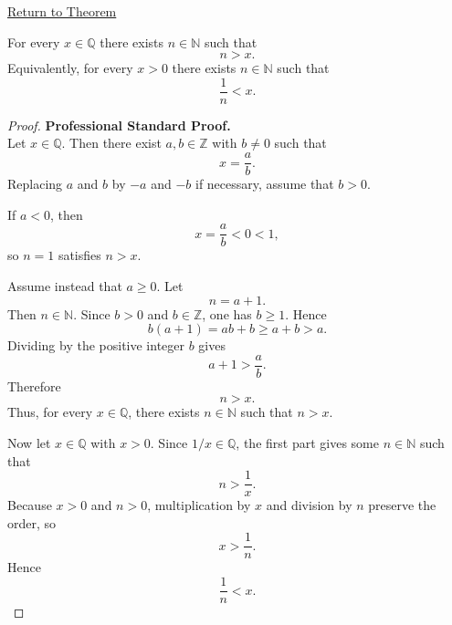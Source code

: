 \newpage
{}
\label{prf:archimedean-q}

\begin{remark*}[Return]
\hyperref[thm:archimedean-q]{Return to Theorem}
\end{remark*}

\begin{theorem*}
For every $x\in\mathbb{Q}$ there exists $n\in\mathbb{N}$ such that
\[
n>x.
\]
Equivalently, for every $x>0$ there exists $n\in\mathbb{N}$ such that
\[
\frac{1}{n}<x.
\]
\end{theorem*}

\begin{proof}
\textbf{Professional Standard Proof.}~\\
Let $x \in \mathbb{Q}$. Then there exist $a,b \in \mathbb{Z}$ with
$b \neq 0$ such that
\[
x=\frac{a}{b}.
\]
Replacing $a$ and $b$ by $-a$ and $-b$ if necessary, assume that
$b>0$.

If $a<0$, then
\[
x=\frac{a}{b}<0<1,
\]
so $n=1$ satisfies $n>x$.

Assume instead that $a\ge 0$. Let
\[
n=a+1.
\]
Then $n\in\mathbb{N}$. Since $b>0$ and $b\in\mathbb{Z}$, one has
$b\ge 1$. Hence
\[
b(a+1)=ab+b\ge a+b>a.
\]
Dividing by the positive integer $b$ gives
\[
a+1>\frac{a}{b}.
\]
Therefore
\[
n>x.
\]
Thus, for every $x\in\mathbb{Q}$, there exists $n\in\mathbb{N}$ such
that $n>x$.

Now let $x\in\mathbb{Q}$ with $x>0$. Since $1/x\in\mathbb{Q}$, the
first part gives some $n\in\mathbb{N}$ such that
\[
n>\frac{1}{x}.
\]
Because $x>0$ and $n>0$, multiplication by $x$ and division by $n$
preserve the order, so
\[
x>\frac{1}{n}.
\]
Hence
\[
\frac{1}{n}<x.
\]
\end{proof}

